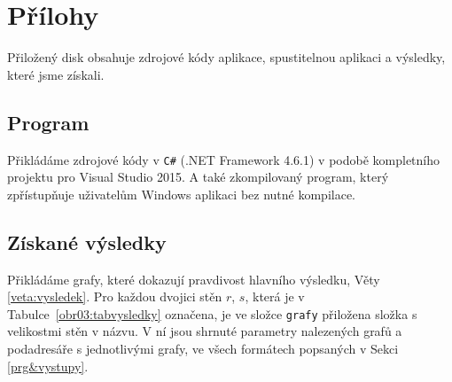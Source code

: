 \documentclass[12pt,a4paper]{report}
\let\openright=\clearpage
\begin{document}



\tableofcontents















\appendix
\chapter{Přílohy}
Přiložený disk obsahuje zdrojové kódy aplikace, spustitelnou aplikaci a výsledky, které jsme získali.

\section{Program} \label{priloha:aplikace}
Přikládáme zdrojové kódy v \texttt{C\#} (.NET Framework 4.6.1) v podobě kompletního projektu pro  Visual Studio 2015. A také zkompilovaný program, který zpřístupňuje uživatelům Windows aplikaci bez nutné kompilace.
 
\section{Získané výsledky} \label{priloha:vysledky}
Přikládáme grafy, které dokazují pravdivost hlavního výsledku, Věty \ref{veta:vysledek}. Pro každou dvojici stěn $r$, $s$, která je v Tabulce~\ref{obr03:tabvysledky} označena, je ve složce \texttt{grafy} přiložena složka s velikostmi stěn v názvu. V ní jsou shrnuté parametry nalezených grafů a podadresáře s jednotlivými grafy, ve všech formátech popsaných v Sekci \ref{prg&vystupy}.
\openright
\end{document}
